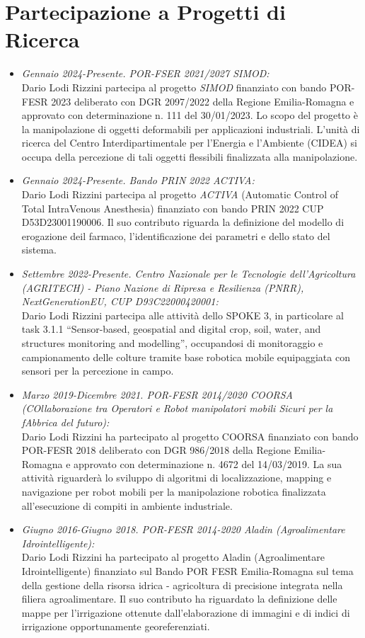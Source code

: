 \documentclass[11pt]{article}
\newcommand{\ITEMDATE}[1]{\item \textit{#1:}\\}
\begin{document}
\section*{Partecipazione a Progetti di Ricerca}

\begin{itemize}

\ITEMDATE{Gennaio 2024-Presente. POR-FSER 2021/2027 SIMOD}
Dario Lodi Rizzini partecipa al progetto \emph{SIMOD} finanziato con bando POR-FESR 2023 deliberato con DGR 2097/2022 della Regione Emilia-Romagna e approvato con determinazione n. 111 del 30/01/2023. 
Lo scopo del progetto \`e la manipolazione di oggetti deformabili per applicazioni industriali. 
L'unit\`a di ricerca del Centro Interdipartimentale per l'Energia e l'Ambiente (CIDEA) si occupa della percezione di tali oggetti flessibili finalizzata alla manipolazione. 

\ITEMDATE{Gennaio 2024-Presente. Bando PRIN 2022 ACTIVA}
Dario Lodi Rizzini partecipa al progetto \emph{ACTIVA} (Automatic Control of Total IntraVenous Anesthesia) finanziato con bando PRIN 2022 CUP D53D23001190006. 
Il suo contributo riguarda la definizione del modello di erogazione deil farmaco, l'identificazione dei parametri e dello stato del sistema.  

\ITEMDATE{Settembre 2022-Presente. Centro Nazionale per le Tecnologie dell’Agricoltura (AGRITECH) - Piano Nazione di Ripresa e Resilienza (PNRR), NextGenerationEU, CUP D93C22000420001}
Dario Lodi Rizzini partecipa alle attività dello SPOKE 3, in particolare al task 3.1.1 ``Sensor-based, geospatial and digital crop, soil, water, and structures monitoring and modelling'', occupandosi di monitoraggio e campionamento delle colture tramite base robotica mobile equipaggiata con sensori per la percezione in campo. 

\ITEMDATE{Marzo 2019-Dicembre 2021. POR-FESR 2014/2020 COORSA (COllaborazione tra Operatori e Robot manipolatori mobili Sicuri per la fAbbrica del futuro)}
Dario Lodi Rizzini ha partecipato al progetto COORSA finanziato con bando POR-FESR 2018 deliberato con DGR
986/2018 della Regione Emilia-Romagna e approvato con determinazione n. 4672 del 14/03/2019.
La sua attivit\`a riguarder\`a lo sviluppo di algoritmi di localizzazione, mapping e navigazione per robot mobili 
per la manipolazione robotica finalizzata all'esecuzione di compiti in ambiente industriale. 

\ITEMDATE{Giugno 2016-Giugno 2018. POR-FESR 2014-2020 Aladin (Agroalimentare Idrointelligente)}
Dario Lodi Rizzini ha partecipato al progetto Aladin (Agroalimentare Idrointelligente) 
finanziato sul Bando POR FESR Emilia-Romagna sul tema della gestione della risorsa idrica - 
agricoltura di precisione integrata nella filiera agroalimentare. 
Il suo contributo ha riguardato la definizione delle mappe per l'irrigazione ottenute dall'elaborazione 
di immagini e di indici di irrigazione opportunamente georeferenziati.


\end{itemize}
\end{document}
